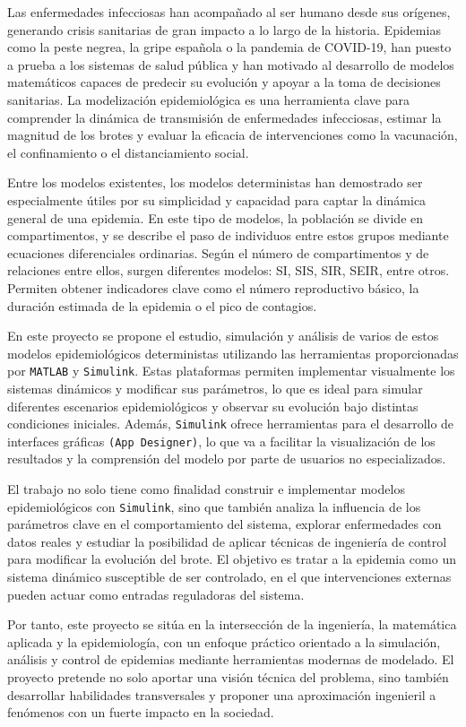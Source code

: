 Las enfermedades infecciosas han acompañado al ser humano desde sus orígenes, generando crisis sanitarias de gran impacto a lo largo de la historia. Epidemias como la peste negrea, la gripe española o la pandemia de COVID-19, han puesto a prueba a los sistemas de salud pública y han motivado al desarrollo de modelos matemáticos capaces de predecir su evolución y apoyar a la toma de decisiones sanitarias. La modelización epidemiológica es una herramienta clave para comprender la dinámica de transmisión de enfermedades infecciosas, estimar la magnitud de los brotes y evaluar la eficacia de intervenciones como la vacunación, el confinamiento o el distanciamiento social.


Entre los modelos existentes, los modelos deterministas han demostrado ser especialmente útiles por su simplicidad y capacidad para captar la dinámica general de una epidemia. En este tipo de modelos, la población se divide en compartimentos, y se describe el paso de individuos entre estos grupos mediante ecuaciones diferenciales ordinarias. Según el número de compartimentos y de relaciones entre ellos, surgen diferentes modelos: SI, SIS, SIR, SEIR, entre otros. Permiten obtener indicadores clave como el número reproductivo básico, la duración estimada de la epidemia o el pico de contagios.


En este proyecto se propone el estudio, simulación y análisis de varios de estos modelos epidemiológicos deterministas utilizando las herramientas proporcionadas por \texttt{MATLAB} y \texttt{Simulink}. Estas plataformas permiten implementar visualmente los sistemas dinámicos y modificar sus parámetros, lo que es ideal para simular diferentes escenarios epidemiológicos y observar su evolución bajo distintas condiciones iniciales. Además, \texttt{Simulink} ofrece herramientas para el desarrollo de interfaces gráficas \texttt{(App Designer)}, lo que va a facilitar la visualización de los resultados y la comprensión del modelo por parte de usuarios no especializados.


El trabajo no solo tiene como finalidad construir e implementar modelos epidemiológicos con \texttt{Simulink}, sino que también analiza la influencia de los parámetros clave en el comportamiento del sistema, explorar enfermedades con datos reales y estudiar la posibilidad de aplicar técnicas de ingeniería de control para modificar la evolución del brote. El objetivo es tratar a la epidemia como un sistema dinámico susceptible de ser controlado, en el que intervenciones externas pueden actuar como entradas reguladoras del sistema.


Por tanto, este proyecto se sitúa en la intersección de la ingeniería, la matemática aplicada y la epidemiología, con un enfoque práctico orientado a la simulación, análisis y control de epidemias mediante herramientas modernas de modelado. El proyecto pretende no solo aportar una visión técnica del problema, sino también desarrollar habilidades transversales y proponer una aproximación ingenieril a fenómenos con un fuerte impacto en la sociedad.
